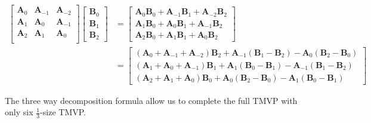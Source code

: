\documentclass[
11pt,notheorems,hyperref={pdfauthor=whatever}
]{beamer}
\begin{document}
\begin{frame}
    \[
\begin{aligned}
    \begin{bmatrix}
        \mathbf A_{0} & \mathbf A_{-1} & \mathbf A_{-2} \\
        \mathbf A_{1} & \mathbf A_{0} & \mathbf A_{-1} \\
        \mathbf A_{2} & \mathbf A_{1} & \mathbf A_{0} \\
    \end{bmatrix}
    \begin{bmatrix}
        \mathbf B_{0} \\ \mathbf B_{1} \\ \mathbf B_{2}
    \end{bmatrix}
    &=
    \begin{bmatrix}
        \mathbf{A}_{0} \mathbf{B}_{0} + \mathbf{A}_{-1} \mathbf{B}_{1} + \mathbf{A}_{-2} \mathbf{B}_{2} \\
        \mathbf{A}_{1} \mathbf{B}_{0} + \mathbf{A}_{0} \mathbf{B}_{1} + \mathbf{A}_{-1} \mathbf{B}_{2} \\
        \mathbf{A}_{2} \mathbf{B}_{0} + \mathbf{A}_{1} \mathbf{B}_{1} + \mathbf{A}_{0} \mathbf{B}_{2}
    \end{bmatrix}
    \\
    &=
    \begin{bmatrix}
        \left(\mathbf{A}_{0} + \mathbf{A}_{-1} + \mathbf{A}_{-2}\right)\mathbf B_{2} 
        + \mathbf A_{-1} (\mathbf B_{1} - \mathbf B_{2}) - \mathbf A_{0} (\mathbf B_{2} - \mathbf B_{0})
        \\
        \left(\mathbf{A}_{1} + \mathbf{A}_{0} + \mathbf{A}_{-1}\right)\mathbf B_{1}   
        + \mathbf A_{1} (\mathbf B_{0}- \mathbf B_{1}) - \mathbf A_{-1} (\mathbf B_{1} - \mathbf B_{2})
        \\
        \left(\mathbf{A}_{2} + \mathbf{A}_{1} + \mathbf{A}_{0} \right)\mathbf B_{0}
        + \mathbf A_{0} (\mathbf B_{2}-\mathbf B_{0}) - \mathbf A_{1} (\mathbf B_{0} - \mathbf B_{1})
    \end{bmatrix}
\end{aligned}
\]

The three way decomposition formula allow us to complete the full TMVP with only six $\frac13$-size TMVP.
\end{frame}
\end{document}
